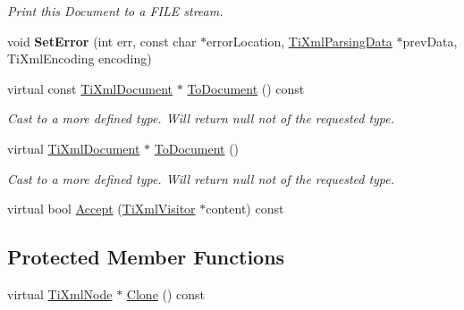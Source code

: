 \begin{DoxyCompactItemize}
\begin{DoxyCompactList}\small\item\em \-Print this \-Document to a \-F\-I\-L\-E stream. \end{DoxyCompactList}\item 
\hypertarget{classTiXmlDocument_a735c23e318597b920c94eae77fa206de}{
void {\bfseries \-Set\-Error} (int err, const char $\ast$error\-Location, \hyperlink{classTiXmlParsingData}{\-Ti\-Xml\-Parsing\-Data} $\ast$prev\-Data, \-Ti\-Xml\-Encoding encoding)}
\label{df/d09/classTiXmlDocument_a735c23e318597b920c94eae77fa206de}

\item 
\hypertarget{classTiXmlDocument_a1dc977bde3e4fe85a8eb9d88a35ef5a4}{
virtual const \hyperlink{classTiXmlDocument}{\-Ti\-Xml\-Document} $\ast$ \hyperlink{classTiXmlDocument_a1dc977bde3e4fe85a8eb9d88a35ef5a4}{\-To\-Document} () const }
\label{df/d09/classTiXmlDocument_a1dc977bde3e4fe85a8eb9d88a35ef5a4}

\begin{DoxyCompactList}\small\item\em \-Cast to a more defined type. \-Will return null not of the requested type. \end{DoxyCompactList}\item 
\hypertarget{classTiXmlDocument_a1025d942a1f328fd742d545e37efdd42}{
virtual \hyperlink{classTiXmlDocument}{\-Ti\-Xml\-Document} $\ast$ \hyperlink{classTiXmlDocument_a1025d942a1f328fd742d545e37efdd42}{\-To\-Document} ()}
\label{df/d09/classTiXmlDocument_a1025d942a1f328fd742d545e37efdd42}

\begin{DoxyCompactList}\small\item\em \-Cast to a more defined type. \-Will return null not of the requested type. \end{DoxyCompactList}\item 
virtual bool \hyperlink{classTiXmlDocument_a3daab2f472418ef66315750202f762ae}{\-Accept} (\hyperlink{classTiXmlVisitor}{\-Ti\-Xml\-Visitor} $\ast$content) const 
\end{DoxyCompactItemize}
\subsection*{\-Protected \-Member \-Functions}
\begin{DoxyCompactItemize}
\item 
virtual \hyperlink{classTiXmlNode}{\-Ti\-Xml\-Node} $\ast$ \hyperlink{classTiXmlDocument_ac9e8f09b23454d953b32d1b65cd1409e}{\-Clone} () const 
\end{DoxyCompactItemize}


